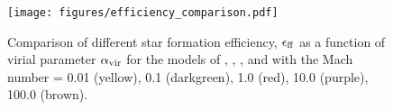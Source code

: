 \documentclass[twocolumn]{aastex631}
\begin{document}
\begin{figure}
\begin{center}
    \texttt{[image: figures/efficiency\_comparison.pdf]}
    \caption{Comparison of different star formation efficiency, $\epsilon_{\rm ff}$ as a function of virial parameter $\alpha_{\rm vir}$ for the models of \citet[][blue]{Padoan_2012}, \citet[][pink]{Hopkins_2013}, \citet[][grey]{Evans_2022}, \citet[][lightgreen]{Semenov_2016} and \citet{Federrath2012} with the Mach number = 0.01 (yellow), 0.1 (darkgreen), 1.0 (red), 10.0 (purple), 100.0 (brown). }
    \label{fig:efficiency_comparison}
\end{center}
\end{figure}


\end{document}
